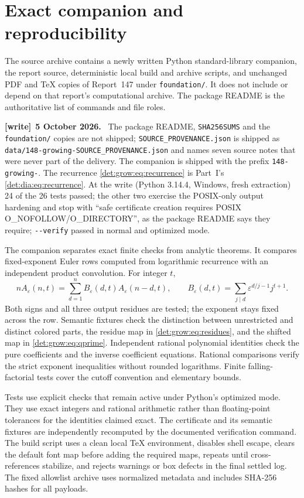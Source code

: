 \documentclass[11pt,letterpaper]{article}
\numberwithin{equation}{section}
\theoremstyle{definition}\newtheorem{definition}[theorem]{Definition}
\theoremstyle{remark}\newtheorem{remark}[theorem]{Remark}
\newcommand{\eps}{\varepsilon}
\newcommand{\file}[1]{\nolinkurl{#1}}
\newenvironment{writenote}[1][]{\par\smallskip\begingroup\small
 \noindent\textbf{[write]}\if\relax\detokenize{#1}\relax\else~\textbf{#1.}\fi\ }%
 {\par\endgroup\smallskip}
\begin{document}
\section{Exact companion and reproducibility}\label{det:grow:sec:companion}
The source archive contains a newly written Python standard-library
companion, the report source, deterministic local build and archive
scripts, and unchanged PDF and TeX copies of Report~147 under
\texttt{foundation/}. It does not include or depend on that report's
computational archive. The package README is the authoritative list of
commands and file roles.
\begin{writenote}[5 October 2026]
The package README, \file{SHA256SUMS} and the \file{foundation/} copies are not shipped; \file{SOURCE_PROVENANCE.json} is shipped as \file{data/148-growing-SOURCE_PROVENANCE.json} and names seven source notes that were never part of the delivery. The companion is shipped with the prefix \file{148-growing-}. The recurrence \eqref{det:grow:eq:recurrence} is Part~I's \eqref{det:dia:eq:recurrence}. At the write (Python 3.14.4, Windows, fresh extraction) 24 of the 26 tests passed; the other two exercise the POSIX-only output hardening and stop with ``safe certificate creation requires POSIX O\_NOFOLLOW/O\_DIRECTORY'', as the package README says they require; \texttt{-{}-verify} passed in normal and optimized mode.
\end{writenote}

The companion separates exact finite checks from analytic theorems.
It compares fixed-exponent Euler rows computed from logarithmic
recurrence with an independent product convolution. For integer $t$,
\begin{equation}\label{det:grow:eq:recurrence}
 nA_\eps(n,t)=\sum_{d=1}^n B_\eps(d,t)A_\eps(n-d,t),\qquad
 B_\eps(d,t)=\sum_{j\mid d}\eps^{d/j-1}j^{t+1}.
\end{equation}
Both signs and all three output residues are tested; the exponent stays
fixed across the row. Semantic fixtures check the distinction between
unrestricted and distinct colored parts, the residue map in
\eqref{det:grow:eq:residues}, and the shifted map in \eqref{det:grow:eq:qprime}.
Independent rational polynomial identities check the pure coefficients
and the inverse coefficient equations. Rational comparisons verify the
strict exponent inequalities without rounded logarithms. Finite
falling-factorial tests cover the cutoff convention and elementary
bounds.

Tests use explicit checks that remain active under Python's optimized
mode. They use exact integers and rational arithmetic rather than
floating-point tolerances for the identities claimed exact. The
certificate and its semantic fixtures are independently recomputed by
the documented verification command. The build script uses a clean
local TeX environment, disables shell escape, clears the default font
map before adding the required maps, repeats until cross-references
stabilize, and rejects warnings or box defects in the final settled log.
The fixed allowlist archive uses normalized metadata and includes
SHA-256 hashes for all payloads.
\end{document}
